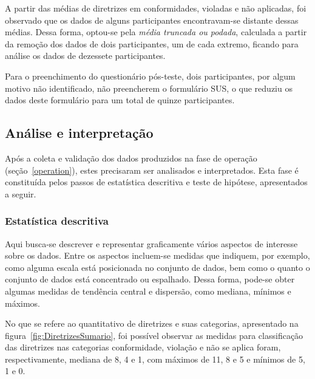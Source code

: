 A partir  das médias  de diretrizes em  conformidades, violadas  e não
aplicadas,  foi  observado  que   os  dados  de  alguns  participantes
encontravam-se  distante dessas  médias.  Dessa  forma,  optou-se pela
{\em  média truncada  ou podada},  calculada a  partir da  remoção dos
dados de dois participantes, um  de cada extremo, ficando para análise
os dados de dezessete participantes.

Para  o preenchimento do  questionário pós-teste,  dois participantes,
por algum motivo não identificado, não preencherem o formulário SUS, o
que  reduziu  os  dados  deste  formulário para  um  total  de  quinze
participantes.

\subsection{Análise e interpretação}
\label{analysis}

Após a  coleta e  validação dos dados  produzidos na fase  de operação
(seção~\ref{operation}),    estes   precisaram   ser    analisados   e
interpretados.  Esta  fase é  constituída pelos passos  de estatística
descritiva e teste de hipótese, apresentados a seguir.

\subsubsection{Estatística descritiva}
\label{descriptiveStatistics}

Aqui busca-se descrever e  representar graficamente vários aspectos de
interesse sobre  os dados.  Entre  os aspectos incluem-se  medidas que
indiquem, por exemplo, como alguma escala está posicionada no conjunto
de dados,  bem como o quanto  o conjunto de dados  está concentrado ou
espalhado.  Dessa  forma, pode-se  obter algumas medidas  de tendência
central e dispersão, como mediana, mínimos e máximos.

No  que se  refere ao  quantitativo de  diretrizes e  suas categorias,
apresentado   na   figura~\ref{fig:DiretrizesSumario},  foi   possível
observar as  medidas para classificação das  diretrizes nas categorias
conformidade, violação e não se aplica foram, respectivamente, mediana
de 8, 4 e 1, com máximos de 11, 8 e 5 e mínimos de 5, 1 e 0.

